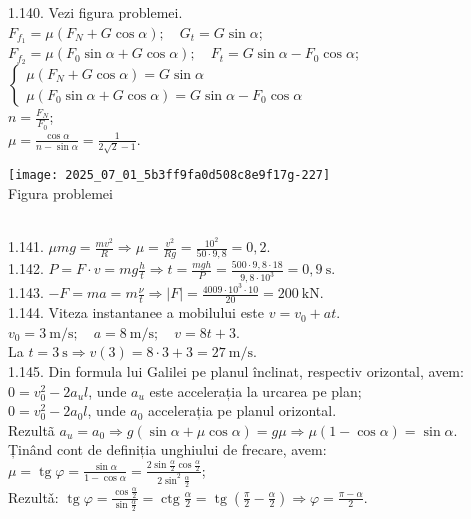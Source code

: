 1.140. Vezi figura problemei.\\ $F_{f_{1}}=\mu\left(F_{N}+G \cos \alpha\right); \quad G_{t}=G \sin \alpha$;\\ $F_{f_{2}}=\mu\left(F_{0} \sin \alpha+G \cos \alpha\right); \quad F_{t}=G \sin \alpha-F_{0} \cos \alpha$;\\ $\left\{\begin{array}{l} \mu\left(F_{N}+G \cos \alpha\right)=G \sin \alpha\\ \mu\left(F_{0} \sin \alpha+G \cos \alpha\right)=G \sin \alpha-F_{0} \cos \alpha \end{array}\right.$\\ $n=\frac{F_{N}}{F_{0}}$;\\ $\mu=\frac{\cos \alpha}{n-\sin \alpha}=\frac{1}{2 \sqrt{2}-1}$.\\ \begin{center} \texttt{[image: 2025\_07\_01\_5b3ff9fa0d508c8e9f17g-227]}\\ Figura problemei \end{center}\\

1.141. $\mu m g=\frac{m v^{2}}{R} \Rightarrow \mu=\frac{v^{2}}{R g}=\frac{10^{2}}{50 \cdot 9,8}=0,2$.\\

1.142. $P=F \cdot v=m g \frac{h}{t} \Rightarrow t=\frac{m g h}{P}=\frac{500 \cdot 9,8 \cdot 18}{9,8 \cdot 10^{3}}=0,9 \mathrm{~s}$.\\

1.143. $-F=m a=m \frac{\nu}{t} \Rightarrow|F|=\frac{4009 \cdot 10^{3} \cdot 10}{20}=200 \mathrm{~kN}$.\\

1.144. Viteza instantanee a mobilului este $v=v_{0}+a t$.\\ $v_{0}=3 \mathrm{~m} / \mathrm{s}; \quad a=8 \mathrm{~m} / \mathrm{s}; \quad v=8 t+3$.\\ La $t=3 \mathrm{~s} \Rightarrow v(3)=8 \cdot 3+3=27 \mathrm{~m} / \mathrm{s}$.\\

1.145. Din formula lui Galilei pe planul înclinat, respectiv orizontal, avem:\\ $0=v_{0}^{2}-2 a_{u} l$, unde $a_{u}$ este accelerația la urcarea pe plan;\\ $0=v_{0}^{2}-2 a_{0} l$, unde $a_{0}$ accelerația pe planul orizontal.\\ Rezultã $a_{u}=a_{0} \Rightarrow g(\sin \alpha+\mu \cos \alpha)=g \mu \Rightarrow \mu(1-\cos \alpha)=\sin \alpha$.\\ Ținând cont de definiția unghiului de frecare, avem:\\ $\mu=\operatorname{tg} \varphi=\frac{\sin \alpha}{1-\cos \alpha}=\frac{2 \sin \frac{\alpha}{2} \cos \frac{\alpha}{2}}{2 \sin ^{2} \frac{\alpha}{2}}$;\\ Rezultǎ: $\operatorname{tg} \varphi=\frac{\cos \frac{\alpha}{2}}{\sin \frac{\alpha}{2}}=\operatorname{ctg} \frac{\alpha}{2}=\operatorname{tg}\left(\frac{\pi}{2}-\frac{\alpha}{2}\right) \Rightarrow \varphi=\frac{\pi-\alpha}{2}$.\\

